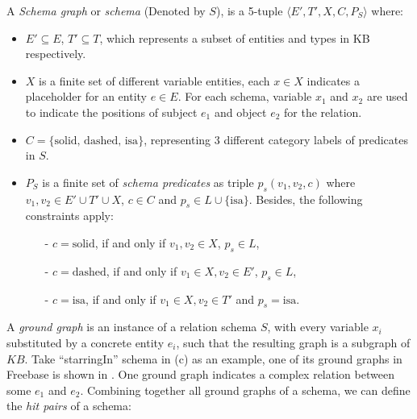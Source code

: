 \begin{definition}
A \textit{Schema graph} or \textit{schema} (Denoted by $S$), is a 5-tuple
$\langle E', T', X, C, P_S \rangle$ where:
\begin{itemize}
  \item $E' \subseteq E$, $T' \subseteq T$, which represents
  a subset of entities and types in KB respectively.
  \item $X$ is a finite set of different variable entities, each $x \in X$
  indicates a placeholder for an entity $e \in E$.
  For each schema, variable $x_1$ and $x_2$ are used to indicate the
  positions of subject $e_1$ and object $e_2$ for the relation.
  \item $C=\{\text{solid, dashed, isa}\}$, representing 3 different
  category labels of predicates in $S$.
  \item $P_S$ is a finite set of \textit{schema predicates} as triple
  $p_s(v_1, v_2, c)$ where $v_1, v_2 \in E' \cup T' \cup X$, $c \in C$
  and $p_s \in L \cup \{\text{isa}\}$. Besides, the following constraints apply:
  \begin{itemize}
    \item[-] $c = \text{solid}$, if and only if $v_1, v_2 \in X$, $p_s \in L$,
    \item[-] $c = \text{dashed}$, if and only if $v_1 \in X, v_2 \in E'$, $p_s \in L$,
    \item[-] $c = \text{isa}$, if and only if $v_1 \in X, v_2 \in T'$ and $p_s = \text{isa}$.
  \end{itemize}

\end{itemize}
\end{definition}

A \textit{ground graph} is an instance of a relation schema $S$, with
every variable $x_i$ substituted by a concrete entity $e_i$,
such that the resulting graph is a subgraph of $KB$.
Take ``starringIn'' schema in (c) as an example,
one of its ground graphs in Freebase is shown in .
One ground graph indicates a complex relation between some $e_1$ and $e_2$.
Combining together all ground graphs of a schema,
we can define the \textit{hit pairs} of a schema:

